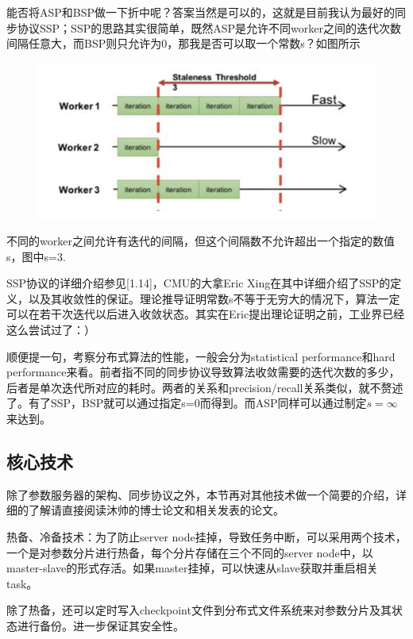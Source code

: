 \documentclass[12pt]{article}
\begin{document}
能否将ASP和BSP做一下折中呢？答案当然是可以的，这就是目前我认为最好的同步协议SSP；SSP的思路其实很简单，既然ASP是允许不同worker之间的迭代次数间隔任意大，而BSP则只允许为0，那我是否可以取一个常数s？如图所示
\begin{figure}[H]
    \centering
    \includegraphics[width=1\textwidth]{fig/Large_Scale_Synchronize_SSP.png}
\end{figure}
不同的worker之间允许有迭代的间隔，但这个间隔数不允许超出一个指定的数值s，图中s=3.

SSP协议的详细介绍参见[1.14]，CMU的大拿Eric Xing在其中详细介绍了SSP的定义，以及其收敛性的保证。理论推导证明常数s不等于无穷大的情况下，算法一定可以在若干次迭代以后进入收敛状态。其实在Eric提出理论证明之前，工业界已经这么尝试过了：）

顺便提一句，考察分布式算法的性能，一般会分为statistical performance和hard performance来看。前者指不同的同步协议导致算法收敛需要的迭代次数的多少，后者是单次迭代所对应的耗时。两者的关系和precision/recall关系类似，就不赘述了。有了SSP，BSP就可以通过指定s=0而得到。而ASP同样可以通过制定$s=\infty$来达到。

\subsection{核心技术}
除了参数服务器的架构、同步协议之外，本节再对其他技术做一个简要的介绍，详细的了解请直接阅读沐帅的博士论文和相关发表的论文。

热备、冷备技术：为了防止server node挂掉，导致任务中断，可以采用两个技术，一个是对参数分片进行热备，每个分片存储在三个不同的server node中，以master-slave的形式存活。如果master挂掉，可以快速从slave获取并重启相关task。

除了热备，还可以定时写入checkpoint文件到分布式文件系统来对参数分片及其状态进行备份。进一步保证其安全性。
\end{document}
